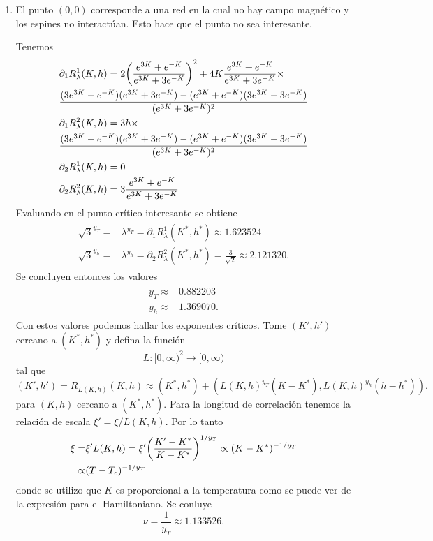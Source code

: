 \documentclass{article}
\begin{document}
\begin{enumerate}
\item El punto $(0,0)$ corresponde a una red en la cual no hay campo magnético y los espines no interactúan. Esto hace que el punto no sea interesante.

Tenemos
\begin{align}
\begin{split}
&\partial_1 R_\lambda^1(K,h)=2\qty(\frac{e^{3K}+e^{-K}}{e^{3K}+3e^{-K}})^2+4K\frac{e^{3K}+e^{-K}}{e^{3K}+3e^{-K}}\times\\
&\frac{(3e^{3K}-e^{-K})(e^{3K}+3e^{-K})-(e^{3K}+e^{-K})(3e^{3K}-3e^{-K})}{(e^{3K}+3e^{-K})^2}\\
&\partial_1 R_\lambda^2(K,h)=3h\times\\
&\frac{(3e^{3K}-e^{-K})(e^{3K}+3e^{-K})-(e^{3K}+e^{-K})(3e^{3K}-3e^{-K})}{(e^{3K}+3e^{-K})^2}\\
&\partial_2 R_\lambda^1(K,h)=0\\
&\partial_2 R_\lambda^2(K,h)=3\frac{e^{3K}+e^{-K}}{e^{3K}+3e^{-K}}
\end{split}
\end{align} 
Evaluando en el punto crítico interesante se obtiene
\begin{align}
\begin{split}
\sqrt{3}^{y_T}=&\lambda^{y_T}=\partial_1 R_\lambda^1(K^*,h^*)\approx 1.623524\\
\sqrt{3}^{y_h}=&\lambda^{y_h}=\partial_2 R_\lambda^2(K^*,h^*)=\frac{3}{\sqrt{2}}\approx 2.121320.
\end{split}
\end{align}
Se concluyen entonces los valores
\begin{align}
\begin{split}
y_T\approx&0.882203\\
y_h\approx&1.369070.
\end{split}
\end{align}
Con estos valores podemos hallar los exponentes críticos. Tome $(K',h')$ cercano a $(K^*,h^*)$ y defina la función
\begin{equation}
L:[0,\infty)^2\rightarrow[0,\infty)
\end{equation}
tal que
\begin{equation}
(K',h')=R_{L(K,h)}(K,h)\approx(K^*,h^*)+(L(K,h)^{y_T}(K-K^*),L(K,h)^{y_h}(h-h^*)).
\end{equation}
para $(K,h)$ cercano a $(K^*,h^*)$.
Para la longitud de correlación tenemos la relación de escala $\xi'=\xi/L(K,h)$. Por lo tanto
\begin{align}
\begin{split}
\xi=&\xi'L(K,h)=\xi'\qty(\frac{K'-K^*}{K-K^*})^{1/y_T}\propto (K-K^*)^{-1/y_T}\\
\propto&(T-T_c)^{-1/y_T}
\end{split}
\end{align}
donde se utilizo que $K$ es proporcional a la temperatura como se puede ver de la expresión para el Hamiltoniano. Se conluye
\begin{equation}
\nu=\frac{1}{y_T}\approx 1.133526.
\end{equation}
\end{enumerate}



\end{document}
